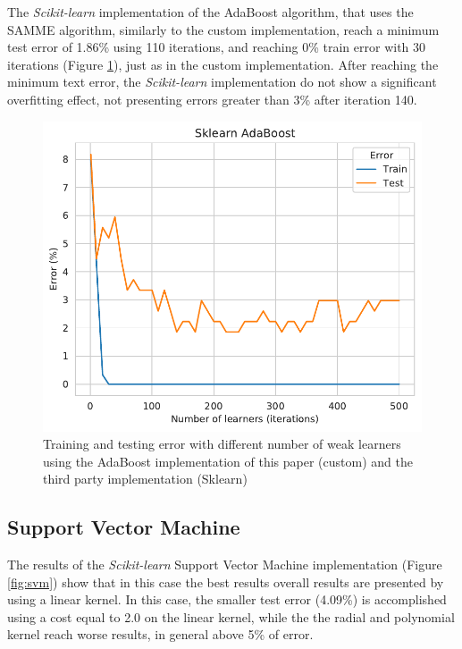\documentclass[11pt,twocolumn,letterpaper]{article}
\begin{document}
The \textit{Scikit-learn} implementation of the AdaBoost algorithm, that uses the SAMME algorithm, similarly to the custom implementation, reach a minimum test error of 1.86\% using 110 iterations, and reaching 0\% train error with 30 iterations (Figure \ref{fig:nlearners_adaboost_sklearn}), just as in the custom implementation. After reaching the minimum text error, the \textit{Scikit-learn} implementation do not show a significant overfitting effect, not presenting errors greater than 3\% after iteration 140.

\begin{figure}[h]
	\begin{center}
		\includegraphics[width=1.0\linewidth]{nlearners_adaboost_sklearn.pdf}
		\caption{Training and testing error with different number of weak learners using the AdaBoost implementation of this paper (custom) and the third party implementation (Sklearn)}
		\label{fig:nlearners_adaboost_sklearn}
	\end{center}
\end{figure}

\subsection{Support Vector Machine}

The results of the \textit{Scikit-learn} Support Vector Machine implementation (Figure \ref{fig:svm}) show that in this case the best results overall results are presented by using a linear kernel. In this case, the smaller test error (4.09\%) is accomplished using a cost equal to 2.0 on the linear kernel, while the the radial and polynomial kernel reach worse results, in general above 5\% of error.
\end{document}
